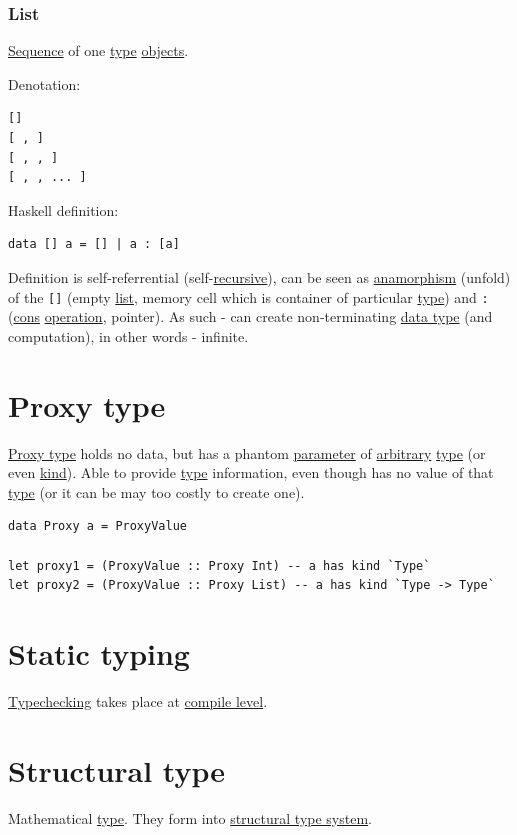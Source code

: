 \documentclass[a4paper,14pt,oneside]{book}
\begin{document}
\subsubsection{\label{orga17c874}List}
\label{sec:orgc97f1e6}
\hyperref[orge2b57aa]{Sequence} of one \hyperref[orgde40363]{type} \hyperref[org88e24d2]{objects}.

Denotation:
\begin{verbatim}
[]
[ , ]
[ , , ]
[ , , ... ]
\end{verbatim}

Haskell definition:
\begin{verbatim}
data [] a = [] | a : [a]
\end{verbatim}

Definition is self-referrential (self-\hyperref[org8f63f37]{recursive}), can be seen as \hyperref[org5495af2]{anamorphism} (unfold) of the \texttt{[]} (empty \hyperref[orga17c874]{list}, memory cell which is container of particular \hyperref[orgde40363]{type}) and \texttt{:} (\hyperref[org4e30d25]{cons} \hyperref[orgf96349c]{operation}, pointer). As such - can create non-terminating \hyperref[org89def2c]{data type} (and computation), in other words - infinite.

\section{\label{org08ee157}Proxy type}
\label{sec:org9bcefc9}
\hyperref[org08ee157]{Proxy type} holds no data, but has a phantom \hyperref[org08c9428]{parameter} of \hyperref[org6e95d93]{arbitrary} \hyperref[orgde40363]{type} (or even \hyperref[orgc50620f]{kind}). Able to provide \hyperref[orgde40363]{type} information, even though has no value of that \hyperref[orgde40363]{type} (or it can be may too costly to create one).
\begin{verbatim}
data Proxy a = ProxyValue

let proxy1 = (ProxyValue :: Proxy Int) -- a has kind `Type`
let proxy2 = (ProxyValue :: Proxy List) -- a has kind `Type -> Type`
\end{verbatim}

\section{\label{org8f1322d}Static typing}
\label{sec:org99dfd25}
\hyperref[orge4868ac]{Typechecking} takes place at \hyperref[orga6279f0]{compile level}.

\section{\label{orgb05cb4e}Structural type}
\label{sec:org3264b1d}
Mathematical \hyperref[orgde40363]{type}. They form into \hyperref[org96a3f4f]{structural type system}.
\end{document}
